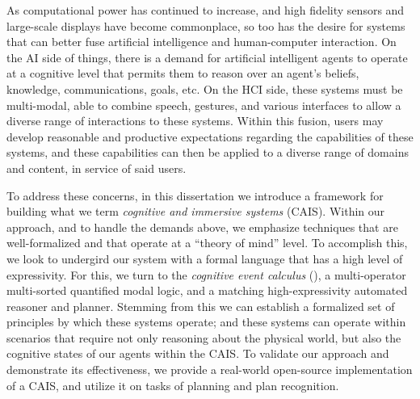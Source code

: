  

As computational power has continued to increase, and high fidelity sensors and
large-scale displays have become commonplace, so too has the
desire for
systems that can better fuse artificial intelligence and
human-computer interaction.  On the AI side of things, there is a
demand for artificial intelligent agents to operate at a cognitive
level that permits them to reason over an agent's beliefs, knowledge,
communications, goals, etc.  On the HCI side, these systems must be
multi-modal, able to combine speech, gestures, and various interfaces
to allow a diverse range of interactions to these systems.  Within
this fusion, users may develop reasonable and productive expectations
regarding the capabilities of these systems, and these capabilities
can then be applied to a diverse range of domains and content, in
service of said users.

To address these concerns, in this dissertation we introduce a
framework for building what we term \textit{cognitive and immersive
systems} (CAIS).  Within our approach, and to handle the demands
above, we emphasize techniques that are well-formalized and that
operate at a ``theory of mind'' level.  To accomplish this, we look to
undergird our system with a formal language that has a high level of
expressivity.  For this, we turn to the \textit{cognitive event
calculus} (\CEC), a multi-operator multi-sorted quantified modal
logic, and a matching high-expressivity automated reasoner and
planner.  Stemming from this we can establish a formalized set of
principles by which these systems operate; and these systems can
operate within scenarios that require not only reasoning about the
physical world, but also the cognitive states of our agents within the
CAIS.  To validate our approach and demonstrate its effectiveness, we
provide a real-world open-source implementation of a CAIS, and utilize
it on tasks of planning and plan recognition.